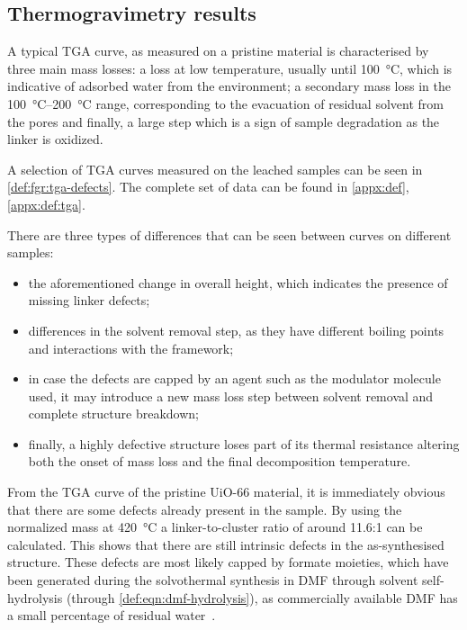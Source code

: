 
\subsection{Thermogravimetry results}

A typical TGA curve, as measured on a pristine material
is characterised by three main mass losses: a loss
at low temperature, usually until \SI{100}{\degreeCelsius},
which is indicative of adsorbed water from the environment;
a secondary mass loss in the \SIrange{100}{200}{\degreeCelsius}
range, corresponding to the evacuation of residual solvent 
from the pores and finally, a large step which is a sign of 
sample degradation as the linker is oxidized.

A selection of TGA curves measured on the leached samples
can be seen in \autoref{def:fgr:tga-defects}. The complete set of data
can be found in \autoref{appx:def}, \autoref{appx:def:tga}.

There are three types of differences that can be seen 
between curves on different samples:

\begin{itemize}
    \item the aforementioned change in overall height,
    which indicates the presence of missing linker defects;
    \item differences in the solvent removal step, as they
    have different boiling points and interactions with the 
    framework;
    \item in case the defects are capped by an agent such as 
    the modulator molecule used, it may introduce a new 
    mass loss step between solvent removal and complete
    structure breakdown;
    \item finally, a highly defective structure loses part 
    of its thermal resistance altering both the onset of mass
    loss and the final decomposition temperature.
\end{itemize}

From the TGA curve of the pristine UiO-66 material, 
it is immediately obvious that there are some defects 
already present in the sample. By using the normalized
mass at \SI{420}{\degreeCelsius} a linker-to-cluster 
ratio of around 11.6:1 can be calculated. This shows that
there are still intrinsic defects in the as-synthesised 
structure. These defects are most likely capped by 
formate moieties, which have been generated during 
the solvothermal synthesis in DMF through solvent 
self-hydrolysis (through \autoref{def:eqn:dmf-hydrolysis}), as 
commercially available DMF has a small percentage of 
residual water~\cite{shearerDefectEngineeringTuning2016}.

